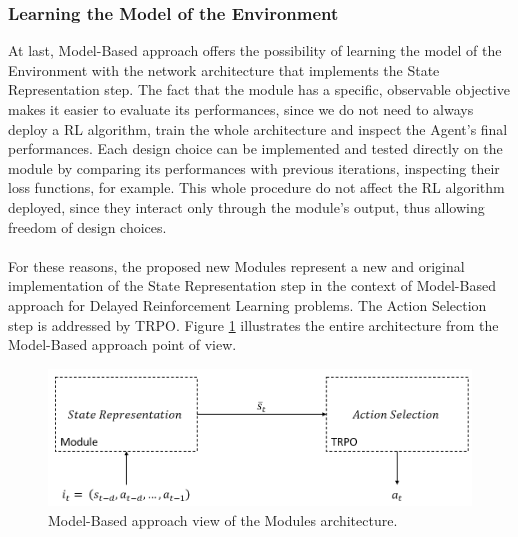             \subsubsection{Learning the Model of the Environment}
                At last, Model-Based approach offers the possibility of learning the model of the Environment with the network architecture that implements the State Representation step. The fact that the module has a specific, observable objective makes it easier to evaluate its performances, since we do not need to always deploy a RL algorithm, train the whole architecture and inspect the Agent's final performances. Each design choice can be implemented and tested directly on the module by comparing its performances with previous iterations, inspecting their loss functions, for example. This whole procedure do not affect the RL algorithm deployed, since they interact only through the module's output, thus allowing freedom of design choices.
                \\\\
            
            For these reasons, the proposed new Modules represent a new and original implementation of the State Representation step in the context of Model-Based approach for Delayed Reinforcement Learning problems. The Action Selection step is addressed by TRPO. Figure \ref{fig:module_modelbased_view} illustrates the entire architecture from the Model-Based approach point of view.
                
                \begin{figure}[!t]
                        \centering
                        \includegraphics[width=15cm, keepaspectratio]{images/module/modelbased_view.png}
                        \caption{Model-Based approach view of the Modules architecture.}
                        \label{fig:module_modelbased_view}
                \end{figure}
            

